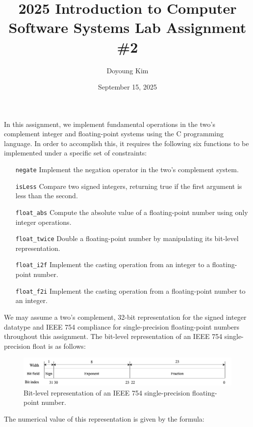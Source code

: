 \documentclass{article}
\title{\textbf{2025 Introduction to Computer Software Systems Lab Assignment
\#2}}
\date{September 15, 2025}
\author{Doyoung Kim}
\begin{document}
\maketitle

In this assignment, we implement fundamental operations in the two's complement 
integer and floating-point systems using the C programming language. In order to 
accomplish this, it requires the following six functions to be implemented under 
a specific set of constraints:

\begin{enumerate}
    \item[\texttt{negate}] Implement the negation operator in the two's 
    complement system.
    \item[\texttt{isLess}] Compare two signed integers, returning true if the 
    first argument is less than the second.
    \item[\texttt{float\_abs}] Compute the absolute value of a floating-point
    number using only integer operations.
    \item[\texttt{float\_twice}] Double a floating-point number by manipulating 
    its bit-level representation.
    \item[\texttt{float\_i2f}] Implement the casting operation from an integer 
    to a floating-point number.
    \item[\texttt{float\_f2i}] Implement the casting operation from a
    floating-point number to an integer.
\end{enumerate}

We may assume a two's complement, 32-bit representation for the signed integer
datatype and IEEE 754 compliance for single-precision floating-point numbers
throughout this assignment. The bit-level representation of an IEEE 754
single-precision float is as follows:

\begin{figure}[h]
    \centering
    \includegraphics[width=.75\textwidth]{figure1.png}
    \caption{
        Bit-level representation of an IEEE 754 single-precision floating-point 
        number.
    }
\end{figure}

\newpage

The numerical value of this representation is given by the formula:
\end{document}
